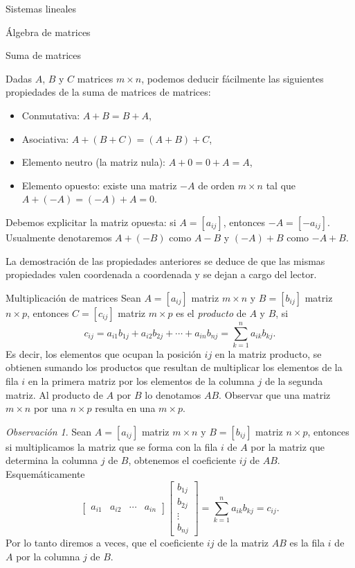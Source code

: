 \documentclass[a4paper,12pt,twoside,spanish]{amsbook}
\theoremstyle{definition}
\theoremstyle{remark}
\newtheorem{obs}{Observaci\'on}[section]
\begin{document}
\begin{chapter}{Sistemas lineales}
\begin{section}{Álgebra de matrices}
\begin{subsection}{Suma  de matrices}
				
				Dadas $A$, $B$ y $C$ matrices $m \times n$, podemos deducir fácilmente las siguientes propiedades de la suma de matrices de matrices:
				\begin{itemize}
					\item Conmutativa: $A + B = B + A$,
					\item Asociativa: $A + (B + C) = (A + B) + C$,
					\item Elemento neutro (la matriz nula): $A + 0 = 0 + A = A$,
					\item Elemento opuesto: existe una matriz $-A$ de orden $m \times n$ tal que  $A + (-A) = (-A) + A = 0$.
				\end{itemize}
				Debemos explicitar la matriz opuesta: si $A = [a_{ij}]$,  entonces $-A = [-a_{ij}]$. Usualmente denotaremos $A + (-B)$ como $A-B$ y $(-A)+B$ como $-A+B$. 
				
				La demostración de las propiedades anteriores se deduce de que las mismas propiedades valen coordenada a coordenada y se dejan a cargo del lector. 
			\end{subsection}		
			
			\begin{subsection}{Multiplicación de matrices} Sean $A=[a_{ij}]$ matriz $m \times n$ y 		 $B=[b_{ij}]$ matriz $n \times p$, entonces $C=[c_{ij}]$ matriz $m \times p$  es el \textit{producto} de $A$ y $B$, si 
				\begin{equation}\label{mtrx-mult}
				c_{ij} = a_{i1}b_{1j}+a_{i2}b_{2j}+\cdots+a_{in}b_{nj}= \sum_{k=1}^{n}a_{ik}b_{kj}.
				\end{equation}
				Es decir, los elementos que ocupan la posición $ij$ en la matriz producto, se obtienen sumando 	los productos que resultan de multiplicar los elementos de la fila $i$ en la primera matriz por los
				elementos de la columna $j$ de la segunda matriz. Al producto de $A$ por $B$ lo denotamos $AB$. Observar que una matriz $m \times n$ por una $n \times p$ resulta en una $m \times p$.
				
				\begin{obs}\label{mtrx-filasxcols}
					 Sean $A=[a_{ij}]$ matriz $m \times n$ y $B=[b_{ij}]$ matriz $n \times p$, entonces si 
					 multiplicamos la matriz que se forma con la fila $i$ de $A$ por la matriz que determina la columna $j$ de $B$, obtenemos el coeficiente $ij$ de $AB$.
					Esquemáticamente
					\begin{equation*}
					\begin{bmatrix} a_{i1}& a_{i2}& \cdots &a_{in}\end{bmatrix}
					\begin{bmatrix} b_{1j}\\ b_{2j}\\ \vdots \\b_{nj}\end{bmatrix} =  \sum_{k=1}^{n}a_{ik}b_{kj} = c_{ij}.
					\end{equation*}
					Por lo tanto diremos a veces, que el coeficiente $ij$ de la matriz $AB$ es la fila $i$ de $A$ por la columna $j$ de $B$. 
				\end{obs}	
				

\end{subsection}
\end{section}
\end{chapter}
\end{document}
